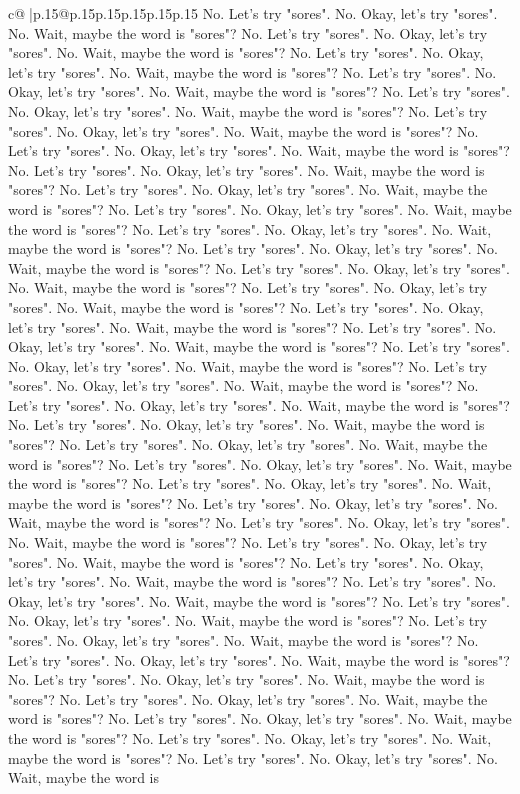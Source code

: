 \documentclass{article}
\begin{document}
{\begin{supertabular}{c@{$\;$}|p{.15\linewidth}@{}p{.15\linewidth}p{.15\linewidth}p{.15\linewidth}p{.15\linewidth}p{.15\linewidth}}
{{{No. Let's try "sores". No. Okay, let's try "sores". No. Wait, maybe the word is "sores"? No. Let's try "sores". No. Okay, let's try "sores". No. Wait, maybe the word is "sores"? No. Let's try "sores". No. Okay, let's try "sores". No. Wait, maybe the word is "sores"? No. Let's try "sores". No. Okay, let's try "sores". No. Wait, maybe the word is "sores"? No. Let's try "sores". No. Okay, let's try "sores". No. Wait, maybe the word is "sores"? No. Let's try "sores". No. Okay, let's try "sores". No. Wait, maybe the word is "sores"? No. Let's try "sores". No. Okay, let's try "sores". No. Wait, maybe the word is "sores"? No. Let's try "sores". No. Okay, let's try "sores". No. Wait, maybe the word is "sores"? No. Let's try "sores". No. Okay, let's try "sores". No. Wait, maybe the word is "sores"? No. Let's try "sores". No. Okay, let's try "sores". No. Wait, maybe the word is "sores"? No. Let's try "sores". No. Okay, let's try "sores". No. Wait, maybe the word is "sores"? No. Let's try "sores". No. Okay, let's try "sores". No. Wait, maybe the word is "sores"? No. Let's try "sores". No. Okay, let's try "sores". No. Wait, maybe the word is "sores"? No. Let's try "sores". No. Okay, let's try "sores". No. Wait, maybe the word is "sores"? No. Let's try "sores". No. Okay, let's try "sores". No. Wait, maybe the word is "sores"? No. Let's try "sores". No. Okay, let's try "sores". No. Wait, maybe the word is "sores"? No. Let's try "sores". No. Okay, let's try "sores". No. Wait, maybe the word is "sores"? No. Let's try "sores". No. Okay, let's try "sores". No. Wait, maybe the word is "sores"? No. Let's try "sores". No. Okay, let's try "sores". No. Wait, maybe the word is "sores"? No. Let's try "sores". No. Okay, let's try "sores". No. Wait, maybe the word is "sores"? No. Let's try "sores". No. Okay, let's try "sores". No. Wait, maybe the word is "sores"? No. Let's try "sores". No. Okay, let's try "sores". No. Wait, maybe the word is "sores"? No. Let's try "sores". No. Okay, let's try "sores". No. Wait, maybe the word is "sores"? No. Let's try "sores". No. Okay, let's try "sores". No. Wait, maybe the word is "sores"? No. Let's try "sores". No. Okay, let's try "sores". No. Wait, maybe the word is "sores"? No. Let's try "sores". No. Okay, let's try "sores". No. Wait, maybe the word is "sores"? No. Let's try "sores". No. Okay, let's try "sores". No. Wait, maybe the word is "sores"? No. Let's try "sores". No. Okay, let's try "sores". No. Wait, maybe the word is "sores"? No. Let's try "sores". No. Okay, let's try "sores". No. Wait, maybe the word is "sores"? No. Let's try "sores". No. Okay, let's try "sores". No. Wait, maybe the word is "sores"? No. Let's try "sores". No. Okay, let's try "sores". No. Wait, maybe the word is "sores"? No. Let's try "sores". No. Okay, let's try "sores". No. Wait, maybe the word is "sores"? No. Let's try "sores". No. Okay, let's try "sores". No. Wait, maybe the word is "sores"? No. Let's try "sores". No. Okay, let's try "sores". No. Wait, maybe the word is "sores"? No. Let's try "sores". No. Okay, let's try "sores". No. Wait, maybe the word is "sores"? No. Let's try "sores". No. Okay, let's try "sores". No. Wait, maybe the word is }}}
\end{supertabular}}
\end{document}
